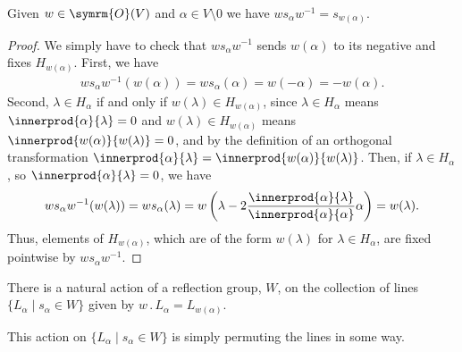\documentclass[fleqn, a4paper, openany]{memoir}
\newcommand{\orthogonal}{\symrm{O}}
\newcommand{\action}{\mathbin{.}}
\begin{document}
    \begin{lma}{}{}
        Given \(w \in \orthogonal(V)\) and \(\alpha \in V \setminus 0\) we have \(ws_\alpha w^{-1} = s_{w(\alpha)}\).
        \begin{proof}
            We simply have to check that \(ws_\alpha w^{-1}\) sends \(w(\alpha)\) to its negative and fixes \(H_{w(\alpha)}\).
            First, we have
            \begin{align}
                ws_{\alpha}w^{-1}(w(\alpha)) = ws_\alpha(\alpha) = w(-\alpha) = -w(\alpha).
            \end{align}
            Second, \(\lambda \in H_\alpha\) if and only if \(w(\lambda) \in H_{w(\alpha)}\), since \(\lambda \in H_\alpha\) means \(\innerprod{\alpha}{\lambda} = 0\) and \(w(\lambda) \in H_{w(\alpha)}\) means \(\innerprod{w(\alpha)}{w(\lambda)} = 0\), and by the definition of an orthogonal transformation \(\innerprod{\alpha}{\lambda} = \innerprod{w(\alpha)}{w(\lambda)}\).
            Then, if \(\lambda \in H_\alpha\), so \(\innerprod{\alpha}{\lambda} = 0\), we have
            \begin{equation}
                ws_\alpha w^{-1}(w(\lambda)) = ws_\alpha(\lambda) = w\left( \lambda - 2\frac{\innerprod{\alpha}{\lambda}}{\innerprod{\alpha}{\alpha}}\alpha \right) = w(\lambda).
            \end{equation}
            Thus, elements of \(H_{w(\alpha)}\), which are of the form \(w(\lambda)\) for \(\lambda \in H_\alpha\), are fixed pointwise by \(ws_\alpha w^{-1}\).
        \end{proof}
    \end{lma}
    
    \begin{crl}{}{}
        There is a natural action of a reflection group, \(W\), on the collection of lines \(\{L_\alpha \mid s_\alpha \in W\}\) given by \(w \action L_\alpha = L_{w(\alpha)}\).
    \end{crl}
    
    This action on \(\{L_\alpha \mid s_\alpha \in W\}\) is simply permuting the lines in some way.
    
\end{document}
